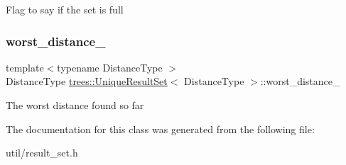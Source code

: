 Flag to say if the set is full \mbox{\label{classtrees_1_1_unique_result_set_acdfe562ad6f99ae5f68b7e8af3d68171}} 
\subsubsection{\texorpdfstring{worst\+\_\+distance\+\_\+}{worst\_distance\_}}
{\footnotesize\ttfamily template$<$typename Distance\+Type $>$ \\
Distance\+Type \hyperlink{classtrees_1_1_unique_result_set}{trees\+::\+Unique\+Result\+Set}$<$ Distance\+Type $>$\+::worst\+\_\+distance\+\_\+\hspace{0.3cm}{\ttfamily [protected]}}

The worst distance found so far 

The documentation for this class was generated from the following file\+:\begin{DoxyCompactItemize}
\item 
util/result\+\_\+set.\+h\end{DoxyCompactItemize}

